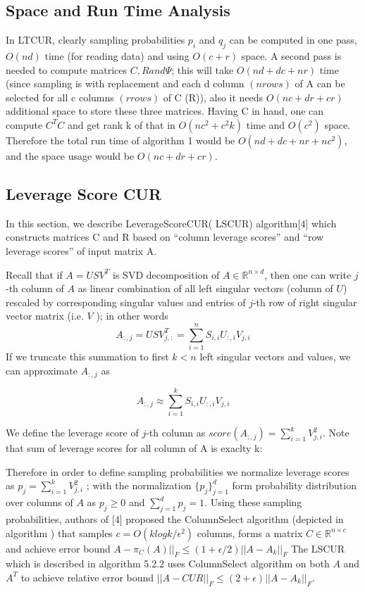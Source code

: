 \documentclass{article}
\begin{document}
\subsection{Space and Run Time Analysis}
In LTCUR, clearly sampling probabilities $p_i$ and $q_j$ can be computed in one pass, $O(nd)$ time (for reading
data) and using $O(c + r)$ space. A second pass is needed to compute matrices $C, R and \Psi$; this will take
$O(nd + dc + nr)$ time (since sampling is with replacement and each d column $(n rows)$ of A can be selected
for all c columns $(r rows)$ of C (R)), also it needs $O(nc + dr + cr)$ additional space to store these three
matrices. Having C in hand, one can compute $C^T C$ and get rank k of that in $O(nc^2 + c^2k)$ time and $O(c^2)$
space. Therefore the total run time of algorithm 1 would be $O(nd + dc + nr + nc^2)$, and the space usage
would be $O(nc + dr + cr)$.


\subsection{Leverage Score CUR}
In this section, we describe LeverageScoreCUR( LSCUR) algorithm[4] which constructs matrices C and R based on “column leverage scores” and “row leverage scores” of input matrix A.

Recall that if $A = USV^T$ is SVD decomposition of $A \in \mathbb{R}^{n \times d}$, then one can write $j$-th column of $A$ as linear combination of all left singular vectors (column of $U$) rescaled by corresponding singular values and entries
of $j$-th row of right singular vector matrix (i.e. $V$ ); in other words
\begin{equation*}
    A_{:,j} = USV^T_{j,:} = \sum^n_{i=1}S_{i,i}U_{:,i}V_{j,i}
\end{equation*}
If we truncate this summation to first $k < n$ left singular vectors and values, we can approximate $A_{:,j}$ as

\begin{equation*}
    A_{:,j} \approx \sum^k_{i=1}S_{i,i}U_{:,i}V_{j,i}
\end{equation*}

We define the leverage score of $j$-th column as $score(A_{:,j}) =  \sum^k_{i=1} V_{j,i}^2 $. Note that sum of leverage scores for
all column of A is exaclty k:

Therefore in order to define sampling probabilities we normalize leverage scores as $p_j = \sum^k_{i=1} V_{j,i}^2$ ; with the normalization $\{p_j\}^d _{j=1}$ form probability distribution over columns of $A$ as $p_j \geq 0$ and $\sum^d_{j=1} p_j = 1$. Using these sampling probabilities, authors of [4] proposed the ColumnSelect algorithm (depicted in algorithm )
that samples $c = O(k log k/\epsilon^2)$ columns, forms a matrix $C \in \mathbb{R}^{n \times c}$ and achieve error bound $A - \pi_C(A)||_F \leq (1 + \epsilon/2)||A - A_k||_F$ The LSCUR which is described in algorithm 5.2.2 uses ColumnSelect algorithm on both $A$ and $A^T$ to achieve relative error bound $||A - CUR||_F \leq (2 + \epsilon)||A - A_k||_F$.
\end{document}
